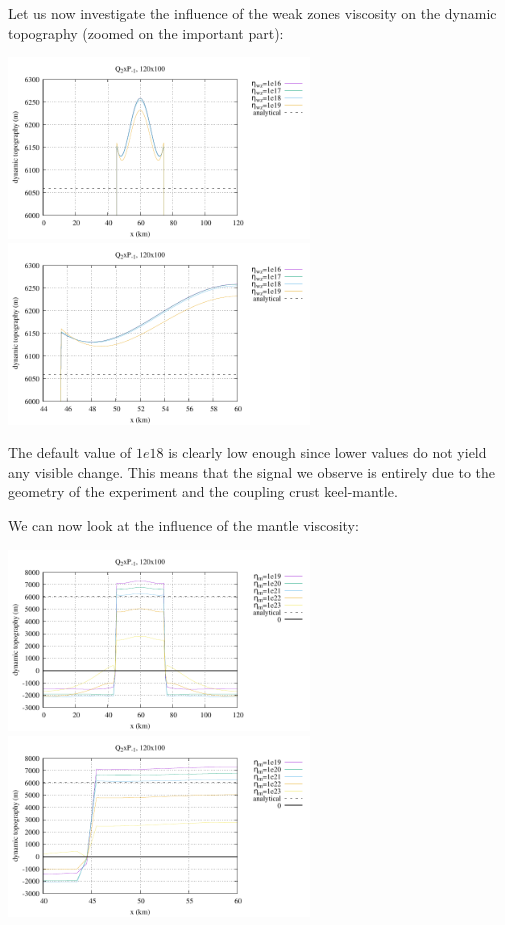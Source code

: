 Let us now investigate the influence of the weak zones viscosity on the 
dynamic topography (zoomed on the important part):
\begin{center}
\includegraphics[width=8cm]{python_codes/fieldstone_160/results/dyn_topo3a.pdf}
\includegraphics[width=8cm]{python_codes/fieldstone_160/results/dyn_topo3b.pdf}
\end{center}
The default value of $1e18$ is clearly low enough since lower values do not 
yield any visible change. This means that the signal we observe is entirely due
to the geometry of the experiment and the coupling crust keel-mantle.

We can now look at the influence of the mantle viscosity:
\begin{center}
\includegraphics[width=8cm]{python_codes/fieldstone_160/results/dyn_topo4a.pdf}
\includegraphics[width=8cm]{python_codes/fieldstone_160/results/dyn_topo4b.pdf}
\end{center}


